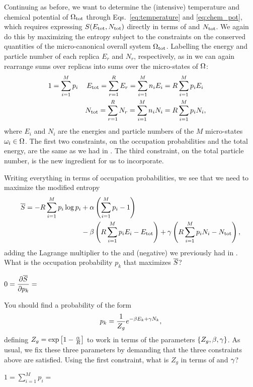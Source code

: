 Continuing as before, we want to determine the (intensive) temperature and chemical potential of $\Omega_{\text{tot}}$ through Eqs.~\ref{eq:temperature} and \ref{eq:chem_pot}, which requires expressing $S(E_{\text{tot}}, N_{\text{tot}})$ directly in terms of \Etot and $N_{\text{tot}}$.
We again do this by maximizing the entropy subject to the constraints on the conserved quantities of the micro-canonical overall system $\Omega_{\text{tot}}$.
Labelling the energy and particle number of each replica $E_r$ and $N_r$, respectively, as in  we can again rearrange sums over replicas into sums over the micro-states of $\Omega$:
\begin{align}
  1 & = \sum_{i = 1}^M p_i & E_{\text{tot}} = \sum_{r = 1}^R E_r = \sum_{i = 1}^M n_i E_i & = R \sum_{i = 1}^M p_i E_i \cr
    &                      & N_{\text{tot}} = \sum_{r = 1}^R N_r = \sum_{i = 1}^M n_i N_i & = R \sum_{i = 1}^M p_i N_i, \label{eq:grand_constraint}
\end{align}
where $E_i$ and $N_i$ are the energies and particle numbers of the $M$ micro-states $\omega_i \in \Omega$.
The first two constraints, on the occupation probabilities and the total energy, are the same as we had in .
The third constraint, on the total particle number, is the new ingredient for us to incorporate.

Writing everything in terms of occupation probabilities, we see that we need to maximize the modified entropy
\begin{align*}
  \overline S = -R \sum_{i = 1}^M p_i \log p_i & + \alpha\left(\sum_{i = 1}^M p_i - 1\right) \\
                                         & - \beta\left(R \sum_{i = 1}^M p_i E_i - E_{\text{tot}}\right) + \gamma\left(R \sum_{i = 1}^M p_i N_i - N_{\text{tot}}\right),
\end{align*}
adding the Lagrange multiplier \ga to the \al and (negative) \be we previously had in .
What is the occupation probability $p_k$ that maximizes $\overline S$?
\begin{mdframed}
  $\displaystyle 0 = \frac{\partial \overline S}{\partial p_k} = $ \\[140 pt] %
\end{mdframed}

You should find a probability of the form
\begin{equation}
  \label{eq:grand_Lagrange}
  p_k = \frac{1}{Z_g} e^{-\beta E_k + \gamma N_k},
\end{equation}
defining $Z_g = \exp\left[1 - \frac{\alpha}{R}\right]$ to work in terms of the parameters $\left\{Z_g, \beta, \gamma\right\}$.
As usual, we fix these three parameters by demanding that the three constraints above are satisfied.
Using the first constraint, what is $Z_g$ in terms of \be and $\gamma$?
\begin{mdframed}
  $\displaystyle 1 = \sum_{i = 1}^M p_i = $ \\[50 pt]
\end{mdframed}

